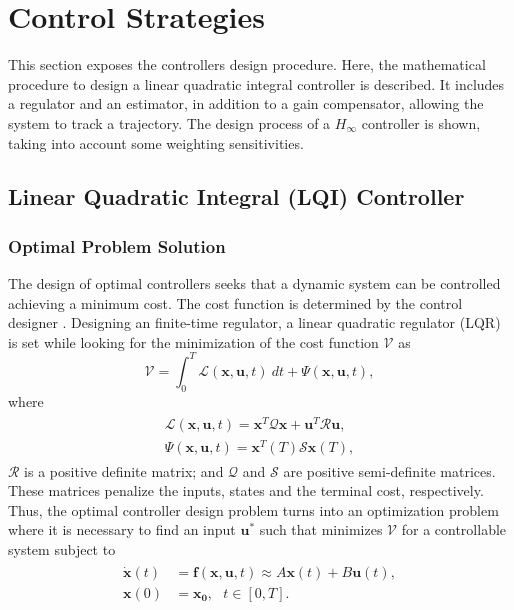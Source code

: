 \section{Control Strategies}
\label{sec:controlstrategies}
This section exposes the controllers design procedure. Here, the mathematical procedure to design a linear quadratic integral controller is described. It includes a regulator and an estimator, in addition to a gain compensator, allowing the system to track a trajectory. The design process of a $H_{\infty}$ controller is shown, taking into account some weighting sensitivities.

\subsection{Linear Quadratic Integral (LQI) Controller}
\subsubsection{Optimal Problem Solution}
The design of optimal controllers seeks that a dynamic system can be controlled achieving a minimum cost. The cost function is determined by the control designer \cite{Steinbuch2007}. Designing an finite-time regulator, a linear quadratic regulator (LQR) is set while looking for the minimization of the cost function $\mathcal{V}$ as
\begin{equation}
\mathcal{V} = \int_{0}^{T}\mathcal{L}(\mathbf{x},\mathbf{u},t)\ dt + \Psi(\mathbf{x},\mathbf{u},t),
\end{equation}
where
\begin{align}
\begin{split}
\mathcal{L}(\mathbf{x},\mathbf{u},t) = \mathbf{x}^{T}\mathcal{Q}\mathbf{x} + \mathbf{u}^{T}\mathcal{R}\mathbf{u},\\[5px]
\Psi(\mathbf{x},\mathbf{u},t) = \mathbf{x}^{T}(T)\mathcal{S}\mathbf{x}(T),
\end{split}
\end{align}
$\mathcal{R}$ is a positive definite matrix; and $\mathcal{Q}$ and $\mathcal{S}$ are positive semi-definite matrices. These matrices penalize the inputs, states and the terminal cost, respectively. Thus, the optimal controller design problem turns into an optimization problem where it is necessary to find an input $\mathbf{u}^{*}$ such that minimizes $\mathcal{V}$ for a controllable system subject to
\begin{align}
\begin{split}
\dot{\mathbf{x}}(t) & = \mathbf{f}(\mathbf{x}, \mathbf{u}, t) \approx A\mathbf{x}(t)+B\mathbf{u}(t),\\[5px]
\mathbf{x}(0) & = \mathbf{x_0},\ \ \ t \in [0, T].
\end{split}
\end{align}
